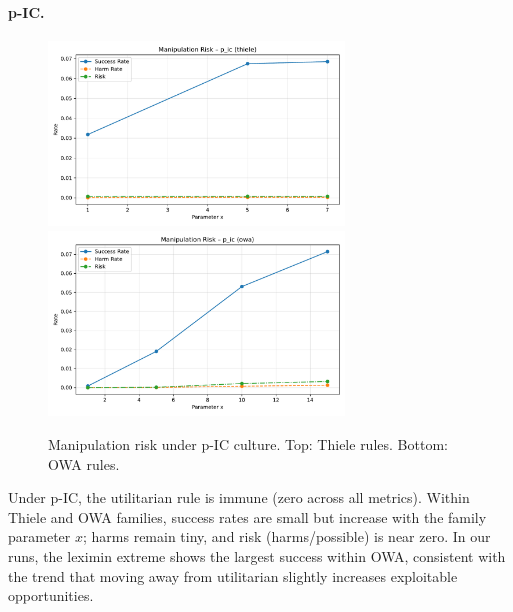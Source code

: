 \documentclass[11pt]{article}
\begin{document}
\paragraph{p-IC.}
\begin{figure}[h!]
\centering
\includegraphics[width=0.7\textwidth]{figures/risk_p_ic_thiele.pdf}
\includegraphics[width=0.7\textwidth]{figures/risk_p_ic_owa.pdf}
\caption{Manipulation risk under p-IC culture. Top: Thiele rules. Bottom: OWA rules.}
\end{figure}
Under p-IC, the utilitarian rule is immune (zero across all metrics). Within Thiele and
OWA families, success rates are small but increase with the family parameter $x$; harms
remain tiny, and risk (harms/possible) is near zero. In our runs, the leximin extreme
shows the largest success within OWA, consistent with the trend that moving away from
utilitarian slightly increases exploitable opportunities.
\end{document}
